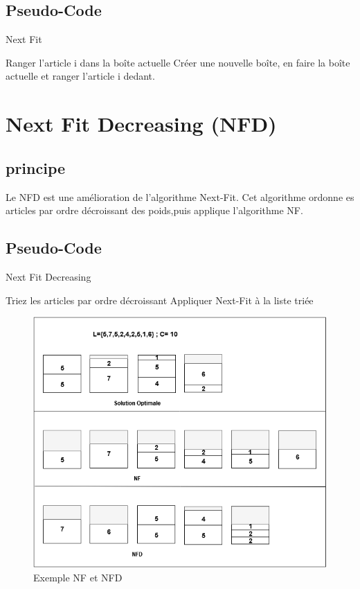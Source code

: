 \documentclass[class=article, crop=false]{standalone}
\begin{document}
\subsection{Pseudo-Code}
\begin{algorithm}[H]
    \caption{Next Fit}
    \begin{algorithmic}
            \STATE Ranger l’article i dans la boîte actuelle
        \ELSE 
            \STATE Créer une nouvelle boîte, en faire la boîte actuelle et ranger l'article i dedant.
        \ENDIF
    \ENDFOR
    \end{algorithmic}
\end{algorithm}

\section{Next Fit Decreasing (NFD)}
\subsection{principe}
Le NFD est une amélioration de l’algorithme Next-Fit. Cet algorithme ordonne es articles par
 ordre décroissant des poids,puis applique l’algorithme NF.

\subsection{Pseudo-Code}
\begin{algorithm}
    \caption{Next Fit Decreasing }
    \begin{algorithmic}
        \STATE Triez les articles par ordre décroissant
        \STATE Appliquer Next-Fit à la liste triée
    \end{algorithmic}
\end{algorithm}

\begin{figure}[H]
    \includegraphics[width=\linewidth]{../figures/NF NFD better(1).png}
    \caption{Exemple NF et NFD}
\end{figure}
\end{document}
